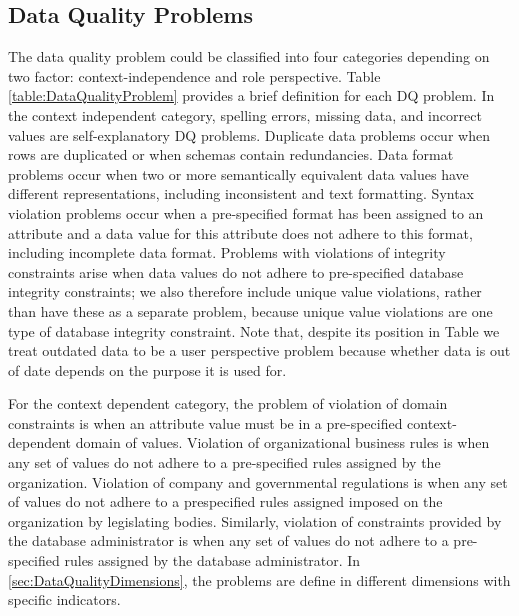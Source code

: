 \documentclass[pdftex,english,oribibl]{llncs}
\begin{document}
\subsection{Data Quality Problems}\label{sec:DataQualityProblems}
The data quality problem could be classified into four categories depending on two factor: context-independence and role perspective.
 Table \ref{table:DataQualityProblem} provides a brief definition for each DQ problem.
 In the context independent category, spelling errors, missing data, and incorrect values are self-explanatory DQ problems.
 Duplicate data problems occur when rows are duplicated or when schemas contain redundancies.
 Data format problems occur when two or more semantically equivalent data values have different representations, including inconsistent and text formatting.
 Syntax violation problems occur when a pre-specified format has been assigned to an attribute and a data value for this attribute does not adhere to this format, including incomplete data format.
 Problems with violations of integrity constraints arise when data values do not adhere to pre-specified database integrity constraints; we also therefore include unique value violations, rather than have these as a separate problem, because unique value violations are one type of database integrity constraint.
 Note that, despite its position in Table we treat outdated data to be a user perspective problem because whether data is out of date depends on the purpose it is used for.

 For the context dependent category, the problem of violation of domain constraints is when an attribute value must be in a pre-specified context-dependent domain of values.
 Violation of organizational business rules is when any set of values do not adhere to a pre-specified rules assigned by the organization.
 Violation of company and governmental regulations is when any set of values do not adhere to a prespecified rules assigned imposed on the organization by legislating bodies.
 Similarly, violation of constraints provided by the database administrator is when any set of values do not adhere to a pre-specified rules assigned by the database administrator. In \ref{sec:DataQualityDimensions}, the problems are define in different dimensions with specific indicators.
\end{document}
